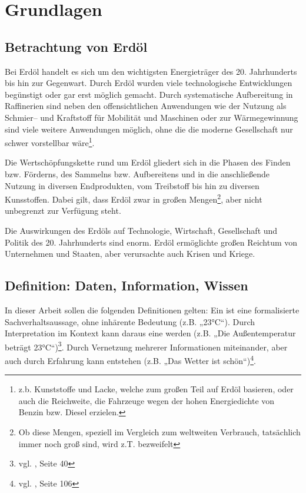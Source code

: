 \section{Grundlagen}
\label{sec:grundlagen}

\subsection{Betrachtung von Erdöl}

Bei Erdöl handelt es sich um den wichtigsten Energieträger des 20. Jahrhunderts bis hin zur Gegenwart. Durch Erdöl wurden viele technologische Entwicklungen begünstigt oder gar erst möglich gemacht. Durch systematische Aufbereitung in Raffinerien sind neben den offensichtlichen Anwendungen wie der Nutzung als Schmier-- und Kraftstoff für Mobilität und Maschinen oder zur Wärmegewinnung sind viele weitere Anwendungen möglich, ohne die die moderne Gesellschaft nur schwer vorstellbar wäre\footnote{z.b. Kunststoffe und Lacke, welche zum großen Teil auf Erdöl basieren, oder auch die Reichweite, die Fahrzeuge wegen der hohen Energiedichte von Benzin bzw. Diesel erzielen.}.

Die Wertschöpfungskette rund um Erdöl gliedert sich in die Phasen des Finden bzw. Förderns, des Sammelns bzw. Aufbereitens und in die anschließende Nutzung in diversen Endprodukten, vom Treibstoff bis hin zu diversen Kunsstoffen.
Dabei gilt, dass Erdöl zwar in großen Mengen\footnote{Ob diese Mengen, speziell im Vergleich zum weltweiten Verbrauch, tatsächlich immer noch groß sind, wird z.T. bezweifelt}, aber nicht unbegrenzt zur Verfügung steht. 

Die Auswirkungen des Erdöls auf Technologie, Wirtschaft, Gesellschaft und Politik des 20. Jahrhunderts sind enorm. Erdöl ermöglichte großen Reichtum von Unternehmen und Staaten, aber verursachte auch Krisen und Kriege.

\subsection{Definition: Daten, Information, Wissen}
\label{defwissen}

In dieser Arbeit sollen die folgenden Definitionen gelten: Ein  ist eine formalisierte Sachverhaltsaussage, ohne inhärente Bedeutung (z.B. „23°C“). Durch Interpretation im Kontext kann daraus eine  werden (z.B. „Die Außentemperatur beträgt 23°C“)\footnote{vgl. \cite{kfk}, Seite 40}. Durch Vernetzung mehrerer Informationen miteinander, aber auch durch Erfahrung kann  entstehen (z.B. „Das Wetter ist schön“)\footnote{vgl. \cite{pnik}, Seite 106}. 

